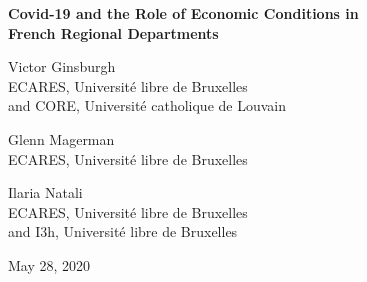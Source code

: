 \documentclass[a4paper]{article}
\theoremstyle{plain}
\theoremstyle{definition}
\begin{document}
\vspace {40mm}

\begin {center}

\vspace {40mm}
\Large

{\bf Covid-19 and the Role of Economic Conditions in \\ French Regional Departments}

\normalsize
\vspace {5mm}

Victor Ginsburgh\\

\small 
ECARES, Universit\'e libre de Bruxelles\\
and CORE, Universit\'e catholique de Louvain

\vspace {5 mm}

\normalsize
Glenn Magerman\\ 

\small 
ECARES, Universit\'e libre de Bruxelles\\
\normalsize
\vspace{5mm}

Ilaria Natali\\

\small 
ECARES, Universit\'e libre de Bruxelles\\
and I3h, Universit\'e libre de Bruxelles
\vspace {10mm}

May 28, 2020
\vspace {5mm}

\end{center}
\normalsize
\begin {abstract}
The recent outbreak of Covid-19 has infected the world at an incredible speed. While there are many similarities across countries in terms of the characteristics of the epidemic spread, there are also large differences across regions. In this paper, we examine regional variation in the outbreak across continental France. We use information on the number of deaths and discharged patients from Covid-19 and socio-economic variables at the department level. Controlling for other factors, we corroborate existing evidence that, unfortunately, inequality kills: departments with more inequality face a higher incidence rate of the disease, expressed as the number of deaths and discharged (gravely ill) patients. Using covariance analysis combining both deaths and releases, we find no statistically differential relationship across factors that contribute to deaths or recoveries.

\vspace{10 mm}
\noindent Keywords: Covid-19, France, departmental effects on the pandemic.\\
JEL codes: I10, I14.

\end{abstract}
\end{document}
